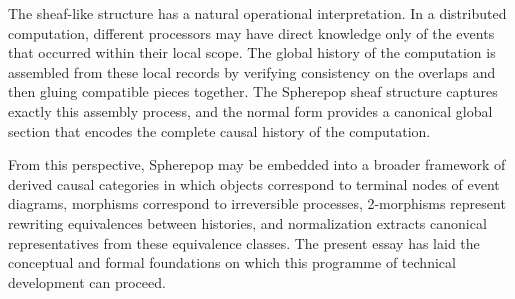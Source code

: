 \documentclass[12pt]{article}
\theoremstyle{plain}
\theoremstyle{definition}
\theoremstyle{remark}
\begin{document}
The sheaf-like structure has a natural operational interpretation.  In a
distributed computation, different processors may have direct knowledge only
of the events that occurred within their local scope.  The global history of
the computation is assembled from these local records by verifying consistency
on the overlaps and then gluing compatible pieces together.  The Spherepop
sheaf structure captures exactly this assembly process, and the normal form
provides a canonical global section that encodes the complete causal history
of the computation.

From this perspective, Spherepop may be embedded into a broader framework of
derived causal categories in which objects correspond to terminal nodes of
event diagrams, morphisms correspond to irreversible processes, 2-morphisms
represent rewriting equivalences between histories, and normalization extracts
canonical representatives from these equivalence classes.  The present essay
has laid the conceptual and formal foundations on which this programme of
technical development can proceed.
\end{document}
